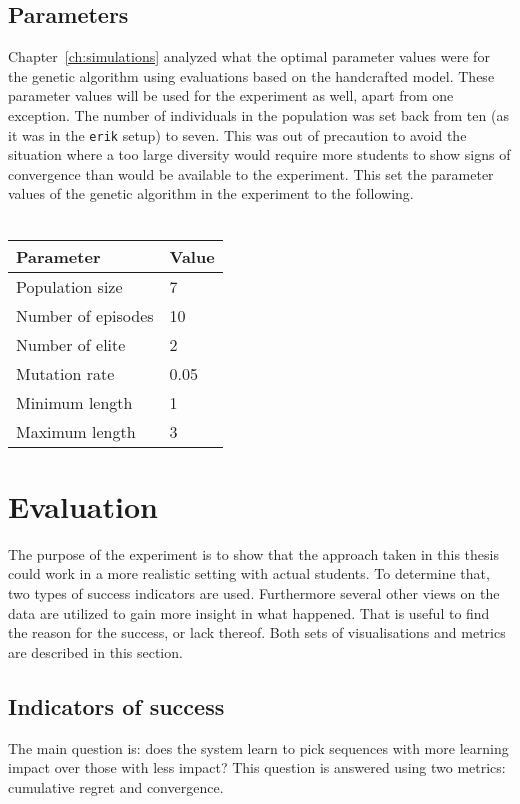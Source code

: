 \subsection{Parameters}
\label{sec:setup_params}
Chapter~\ref{ch:simulations} analyzed what the optimal parameter values were
for the genetic algorithm using evaluations based on the handcrafted model.
These parameter values will be used for the experiment as well, apart from one
exception. The number of individuals in the population was set back from ten
(as it was in the \texttt{erik} setup) to seven. This was out of precaution to
avoid the situation where a too large diversity would require more students to
show signs of convergence than would be available to the experiment. This set
the parameter values of the genetic algorithm in the experiment to the
following.\\\\
\begin{tabular}{ll}\hline
	\textbf{Parameter} &  \textbf{Value}\\\hline
	Population size & 7 \\
	Number of episodes & 10 \\
	Number of elite & 2 \\
	Mutation rate & 0.05 \\
	Minimum length & 1 \\
	Maximum length & 3 \\
\end{tabular}

\section{Evaluation}
\label{sec:setup_eval}
The purpose of the experiment is to show that the approach taken in this thesis
could work in a more realistic setting with actual students. To determine that,
two types of success indicators are used. Furthermore several other views on
the data are utilized to gain more insight in what happened. That is useful to
find the reason for the success, or lack thereof. Both sets of visualisations
and metrics are described in this section.
\subsection{Indicators of success}
The main question is: does the system learn to pick sequences with
more learning impact over those with less impact? This
question is answered using two metrics: cumulative regret and convergence.

